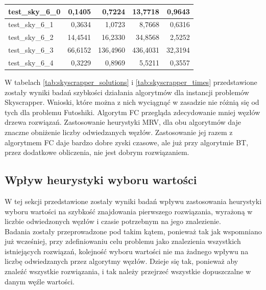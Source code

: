 \documentclass{article}
\begin{document}
\begin{table}[H]
\begin{center}
\begin{tabular}{|l|r|r|r|r|}
				test\_sky\_6\_0 & 0,1405                           & 0,7224                           & 13,7718                                & 0,9643                                 \\ \hline
				test\_sky\_6\_1 & 0,3634                           & 1,0723                           & 8,7668                                 & 0,6316                                 \\ \hline
				test\_sky\_6\_2 & 14,4541                          & 16,2330                          & 34,8568                                & 2,5252                                 \\ \hline
				test\_sky\_6\_3 & 66,6152                          & 136,4960                         & 436,4031                               & 32,3194                                \\ \hline
				test\_sky\_6\_4 & 0,3229                           & 0,8969                           & 5,5211                                 & 0,3557                                 \\ \hline
			\end{tabular}
		\end{center}
	\end{table}

	W tabelach \ref{tab:skyscrapper_solutions} i \ref{tab:skyscrapper_times} przedstawione zostały wyniki badań szybkości działania algorytmów dla instancji problemów Skyscrapper.
	Wnioski, które można z nich wyciągnąć w zasadzie nie różnią się od tych dla problemu Futoshiki. Algorytm FC przegląda zdecydowanie mniej węzłów drzewa rozwiązań. Zastosowanie heurystyki MRV, dla obu algorytmów daje znaczne obniżenie liczby odwiedzanych węzłów. Zastosowanie jej razem z algorytmem FC daje bardzo dobre zyski czasowe, ale już przy algorytmie BT, przez dodatkowe obliczenia, nie jest dobrym rozwiązaniem.

	\subsection{Wpływ heurystyki wyboru wartości}
	W tej sekcji przedstawione zostały wyniki badań wpływu zastosowania heurystyki wyboru wartości na szybkość znajdowania pierwszego rozwiązania, wyrażoną w liczbie odwiedzonych węzłów i czasie potrzebnym na jego znalezienie.\\
	Badania zostały przeprowadzone pod takim kątem, ponieważ tak jak wspomniano już wcześniej, przy zdefiniowaniu celu problemu jako znalezienia wszystkich istniejących rozwiązań, kolejność wyboru wartości nie ma żadnego wpływu na liczbę odwiedzanych przez algorytmy węzłów. Dzieje się tak, ponieważ aby znaleźć wszystkie rozwiązania, i tak należy przejrzeć wszystkie dopuszczalne w danym węźle wartości.
\end{document}
